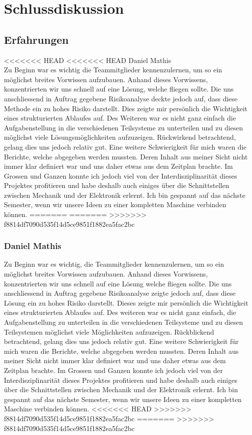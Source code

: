 \section{Schlussdiskussion}

\subsection{Erfahrungen}

<<<<<<< HEAD
<<<<<<< HEAD
Daniel Mathis\\
Zu Beginn war es wichtig die Teammitglieder kennenzulernen, um so ein möglichst breites Vorwissen aufzubauen. Anhand dieses Vorwissens, konzentrierten wir uns schnell auf eine Lösung, welche fliegen sollte. Die uns anschliessend in Auftrag gegebene Risikoanalyse deckte jedoch auf, dass diese Methode ein zu hohes Risiko darstellt. Dies zeigte mir persönlich die Wichtigkeit eines strukturierten Ablaufes auf. Des Weiteren war es nicht ganz einfach die Aufgabenstellung in die verschiedenen Teilsysteme zu unterteilen und zu diesen möglichst viele Lösungsmöglichkeiten aufzuzeigen. Rückwirkend betrachtend, gelang dies uns jedoch relativ gut. Eine weitere Schwierigkeit für mich waren die Berichte, welche abgegeben werden mussten. Deren Inhalt aus meiner Sicht nicht immer klar definiert war und uns daher etwas aus dem Zeitplan brachte. Im Grossen und Ganzen konnte ich jedoch viel von der Interdisziplinarität dieses Projektes profitieren und habe deshalb auch einiges über die Schnittstellen zwischen Mechanik und der Elektronik erlernt. Ich bin gespannt auf das nächste Semester, wenn wir unsere Ideen zu einer kompletten Maschine verbinden können.
=======
=======
>>>>>>> f8814df7090d535f14d5ce9851f1882ea5fac2bc
\subsubsection*{Daniel Mathis}
Zu Beginn war es wichtig, die Teammitglieder kennenzulernen, um so ein 
möglichst breites Vorwissen aufzubauen. Anhand dieses Vorwissens, 
konzentrierten wir uns schnell auf eine Lösung welche fliegen sollte. Die uns 
anschliessend in Auftrag gegebene Risikoanalyse zeigte jedoch auf, dass diese 
Lösung ein zu hohes Risiko darstellt. Dieses zeigte mir persönlich die 
Wichtigkeit eines strukturierten Ablaufes auf. Des weiteren war es nicht ganz 
einfach, die Aufgabenstellung zu unterteilen in die verschiedenen Teilsysteme 
und zu diesen Teilsystemen möglichst viele Möglichkeiten aufzuzeigen. 
Rückblickend betrachtend, gelang dies uns jedoch relativ gut. Eine weitere 
Schwierigkeit für mich waren die Berichte, welche abgegeben werden mussten. 
Deren Inhalt aus meiner Sicht nicht immer klar definiert war und uns daher 
etwas aus dem Zeitplan brachte. Im Grossen und Ganzen konnte ich jedoch viel 
von der Interdisziplinarität dieses Projektes profitieren und habe deshalb 
auch einiges über die Schnittstellen zwischen Mechanik und der Elektronik 
erlernt. Ich bin gespannt auf das nächste Semester, wenn wir unsere Ideen zu 
einer kompletten Maschine verbinden können.
<<<<<<< HEAD
>>>>>>> f8814df7090d535f14d5ce9851f1882ea5fac2bc
=======
>>>>>>> f8814df7090d535f14d5ce9851f1882ea5fac2bc

